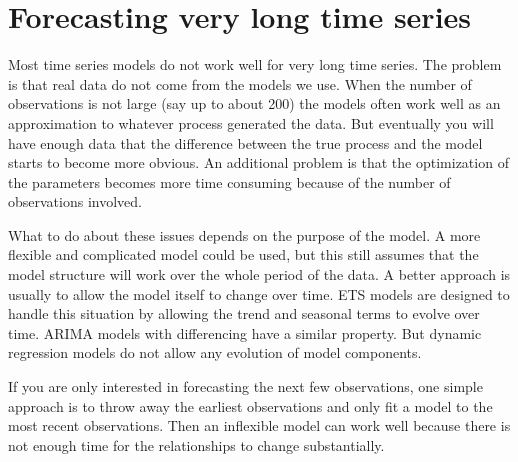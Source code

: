 \documentclass[]{book}
\newenvironment{Shaded}{\begin{snugshade}}{\end{snugshade}}
\newcommand{\ControlFlowTok}[1]{\textcolor[rgb]{0.13,0.29,0.53}{\textbf{#1}}}
\newcommand{\DecValTok}[1]{\textcolor[rgb]{0.00,0.00,0.81}{#1}}
\newcommand{\KeywordTok}[1]{\textcolor[rgb]{0.13,0.29,0.53}{\textbf{#1}}}
\newcommand{\NormalTok}[1]{#1}
\newcommand{\OperatorTok}[1]{\textcolor[rgb]{0.81,0.36,0.00}{\textbf{#1}}}
\newcommand{\StringTok}[1]{\textcolor[rgb]{0.31,0.60,0.02}{#1}}
\begin{document}
\begin{Shaded}
\end{Shaded}

\hypertarget{long-ts}{%
\section{Forecasting very long time series}\label{long-ts}}

Most time series models do not work well for very long time series. The problem is that real data do not come from the models we use. When the number of observations is not large (say up to about 200) the models often work well as an approximation to whatever process generated the data. But eventually you will have enough data that the difference between the true process and the model starts to become more obvious. An additional problem is that the optimization of the parameters becomes more time consuming because of the number of observations involved.

What to do about these issues depends on the purpose of the model. A more flexible and complicated model could be used, but this still assumes that the model structure will work over the whole period of the data. A better approach is usually to allow the model itself to change over time. ETS models are designed to handle this situation by allowing the trend and seasonal terms to evolve over time. ARIMA models with differencing have a similar property. But dynamic regression models do not allow any evolution of model components.

If you are only interested in forecasting the next few observations, one simple approach is to throw away the earliest observations and only fit a model to the most recent observations. Then an inflexible model can work well because there is not enough time for the relationships to change substantially.
\end{document}
